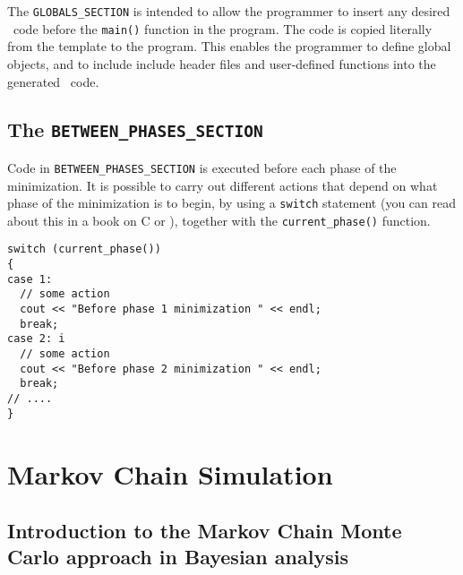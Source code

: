 \documentclass{admbmanual}
\begin{document}
The \texttt{GLOBALS\_SECTION} is intended to allow the programmer to insert any
desired \cplus\ code before the \texttt{main()} function in the program. The
code is copied literally from the template to the program. This enables the
programmer to define global objects, and to include include header files and
user-defined functions into the generated \cplus\ code.


\section{The \texttt{BETWEEN\_PHASES\_SECTION}}

Code in \texttt{BETWEEN\_PHASES\_SECTION} is executed before each phase of the
minimization. It is possible to carry out different actions that depend on what
phase of the minimization is to begin, by using a \texttt{switch} statement (you
can read about this in a book on C or \cplus), together with the
\texttt{current\_phase()} function.
\begin{lstlisting}
switch (current_phase())
{
case 1:
  // some action
  cout << "Before phase 1 minimization " << endl;
  break;
case 2: i
  // some action
  cout << "Before phase 2 minimization " << endl;
  break;
// ....
}
\end{lstlisting}


\chapter{Markov Chain Simulation}

\section{Introduction to the Markov Chain Monte Carlo\br
  approach in Bayesian analysis}
\end{document}
